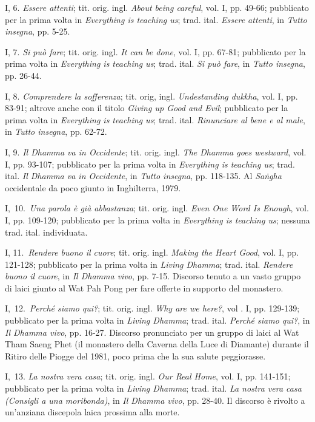 I, 6. \emph{Essere attenti}; tit. orig. ingl. \emph{About being
careful}, vol. I, pp. 49-66; pubblicato per la prima volta in
\emph{Everything is teaching us}; trad. ital. \emph{Essere attenti}, in
\emph{Tutto insegna}, pp. 5-25.

I, 7. \emph{Si può fare}; tit. orig. ingl. \emph{It can be done}, vol.
I, pp. 67-81; pubblicato per la prima volta in \emph{Everything is
teaching us}; trad. ital. \emph{Si può fare}, in \emph{Tutto insegna},
pp. 26-44.

I, 8. \emph{Comprendere la sofferenza}; tit. orig, ingl.
\emph{Undestanding dukkha}, vol. I, pp. 83-91; altrove anche con il
titolo \emph{Giving up Good and Evil}; pubblicato per la prima volta in
\emph{Everything is teaching us}; trad. ital. \emph{Rinunciare al bene e
al male}, in \emph{Tutto insegna}, pp. 62-72.

I, 9. \emph{Il Dhamma va in Occidente}; tit. orig. ingl. \emph{The
Dhamma goes westward}, vol. I, pp. 93-107; pubblicato per la prima volta
in \emph{Everything is teaching us}; trad. ital. \emph{Il Dhamma va in
Occidente}, in \emph{Tutto insegna}, pp. 118-135. Al \emph{Saṅgha}
occidentale da poco giunto in Inghilterra, 1979.

I,~10.~\emph{Una parola è già abbastanza}; tit. orig. ingl. \emph{Even
One Word Is Enough}, vol. I, pp. 109-120; pubblicato per la prima volta
in \emph{Everything is teaching us}; nessuna trad. ital. individuata.

I, 11.~\emph{Rendere buono il cuore}; tit. orig. ingl. \emph{Making the
Heart Good}, vol. I, pp. 121-128; pubblicato per la prima volta in
\emph{Living Dhamma}; trad. ital. \emph{Rendere buono il cuore}, in
\emph{Il Dhamma vivo}, pp. 7-15. Discorso tenuto a un vasto gruppo di
laici giunto al Wat Pah Pong per fare offerte in supporto del monastero.

I,~12.~\emph{Perché siamo qui?}; tit. orig. ingl. \emph{Why are we
here?}, vol . I, pp. 129-139; pubblicato per la prima volta in
\emph{Living Dhamma}; trad. ital. \emph{Perché siamo qui?}, in \emph{Il
Dhamma vivo}, pp. 16-27. Discorso pronunciato per un gruppo di laici al
Wat Tham Saeng Phet (il monastero della Caverna della Luce di Diamante)
durante il Ritiro delle Piogge del 1981, poco prima che la sua salute
peggiorasse.

I,~13. \emph{La nostra vera casa}; tit. orig. ingl. \emph{Our Real
Home}, vol. I, pp. 141-151; pubblicato per la prima volta in
\emph{Living Dhamma}; trad. ital. \emph{La nostra vera casa (Consigli a
una moribonda)}, in \emph{Il Dhamma vivo}, pp. 28-40. Il discorso è
rivolto a un'anziana discepola laica prossima alla morte.

